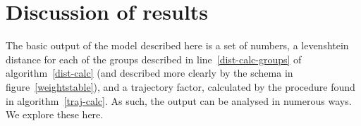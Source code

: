 \section{Discussion of results}
The basic output of the model described here is a set of numbers, a
levenshtein distance for each of the groups described in
line~\ref{dist-calc-groups} of algorithm~\ref{dist-calc} (and
described more clearly by the schema in figure~\ref{weightstable}),
and a trajectory factor, calculated by the procedure found in
algorithm~\ref{traj-calc}. As such, the output can be analysed in
numerous ways. We explore these here.

